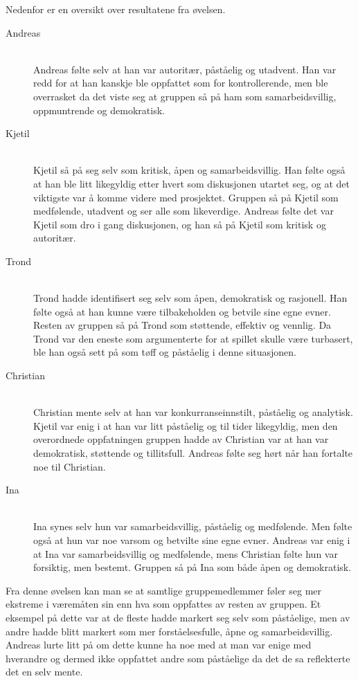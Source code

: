 Nedenfor er en oversikt over resultatene fra øvelsen.
\begin{description}
\item[Andreas] \hfill \\
Andreas følte selv at han var autoritær, påståelig og utadvent. Han var redd for at han kanskje ble oppfattet som for kontrollerende, men ble overrasket da det viste seg at gruppen så på ham som samarbeidsvillig, oppmuntrende og demokratisk. 

\item[Kjetil] \hfill \\
Kjetil så på seg selv som kritisk, åpen og samarbeidsvillig. Han følte også at han ble litt likegyldig etter hvert som diskusjonen utartet seg, og at det viktigste var å komme videre med prosjektet. Gruppen så på Kjetil som medfølende, utadvent og ser alle som likeverdige. Andreas følte det var Kjetil som dro i gang diskusjonen, og han så på Kjetil som kritisk og autoritær.

\item[Trond] \hfill \\	
Trond hadde identifisert seg selv som åpen, demokratisk og rasjonell. Han følte også at han kunne være tilbakeholden og betvile sine egne evner. Resten av gruppen så på Trond som støttende, effektiv og vennlig. Da Trond var den eneste som argumenterte for at spillet skulle være turbasert, ble han også sett på som tøff og påståelig i denne situasjonen. 

\item[Christian] \hfill \\
Christian mente selv at han var konkurranseinnstilt, påståelig og analytisk. Kjetil var enig i at han var litt påståelig og til tider likegyldig, men den overordnede oppfatningen gruppen hadde av Christian var at han var demokratisk, støttende og tillitsfull. Andreas følte seg hørt når han fortalte noe til Christian.

\item[Ina] \hfill \\
Ina synes selv hun var samarbeidsvillig, påståelig og medfølende. Men følte også at hun var noe varsom og betvilte sine egne evner. Andreas var enig i at Ina var samarbeidsvillig og medfølende, mens Christian følte hun var forsiktig, men bestemt. Gruppen så på Ina som både åpen og demokratisk.  

\end{description}
Fra denne øvelsen kan man se at samtlige gruppemedlemmer føler seg mer
ekstreme i væremåten sin enn hva som oppfattes av resten av gruppen. Et
eksempel på dette var at de fleste hadde markert seg selv som
påståelige, men av andre hadde blitt markert som mer forståelsesfulle,
åpne og samarbeidsvillig. Andreas lurte litt på om dette kunne ha noe med
at man var enige med hverandre og dermed ikke oppfattet andre
som påståelige da det de sa reflekterte det en selv mente. 

